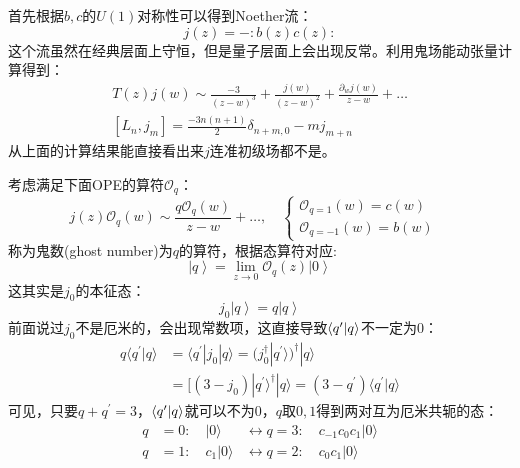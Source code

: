首先根据$b,c$的$U(1)$对称性可以得到Noether流：
\begin{equation}
	j(z)=-:b(z)c(z):
\end{equation}
这个流虽然在经典层面上守恒，但是量子层面上会出现反常。利用鬼场能动张量计算得到：
\begin{equation}
	\begin{gathered}
		T(z)j(w)\sim\frac{-3}{(z-w)^3}+\frac{j(w)}{(z-w)^2}+\frac{\partial_wj(w)}{z-w}+\ldots \\
		[L_n,j_m]=\frac{-3n(n+1)}2\delta_{n+m,0}-mj_{m+n}
	\end{gathered}
\end{equation}
从上面的计算结果能直接看出来$j$连准初级场都不是。

考虑满足下面OPE的算符$\mathcal{O}_q$：
\begin{equation}
	j(z)\mathcal{O}_q(w)\sim\frac{q\mathcal{O}_q(w)}{z-w}+\ldots,\quad\begin{cases}\mathcal{O}_{q=1}(w)=c(w)\\\mathcal{O}_{q=-1}(w)=b(w)&\end{cases}
\end{equation}
称为鬼数(ghost number)为$q$的算符，根据态算符对应:
\begin{equation}
	\left|q\right\rangle=\lim_{{z}\to0}\mathcal{O}_q(z)\left|0\right\rangle 
\end{equation}
这其实是$j_0$的本征态：
\begin{equation}
	j_0\left|q\right\rangle=q\left|q\right\rangle 
\end{equation}
前面说过$j_0$不是厄米的，会出现常数项，这直接导致$\braket{q^\prime}{q}$不一定为0：
\begin{equation}
	\begin{aligned}q\langle q^{\prime}|q\rangle&=\langle q^{\prime}|j_0|q\rangle=(j_0^{\dagger}|q^{\prime}\rangle)^{\dagger}|q\rangle\\&=[(3-j_0)|q^{\prime}\rangle^{\dagger}|q\rangle=(3-q^{\prime})\langle q^{\prime}|q\rangle\end{aligned}
\end{equation}
可见，只要$q+q^\prime=3$，$\braket{q^\prime}{q}$就可以不为0，$q$取$0,1$得到两对互为厄米共轭的态：
\begin{equation}
	\begin{aligned}q&=0:\quad|0\rangle&\leftrightarrow q=3:\quad c_{-1}c_0c_1|0\rangle\\q&=1:\quad c_1|0\rangle&\leftrightarrow q=2:\quad c_0c_1|0\rangle\end{aligned}
\end{equation}
